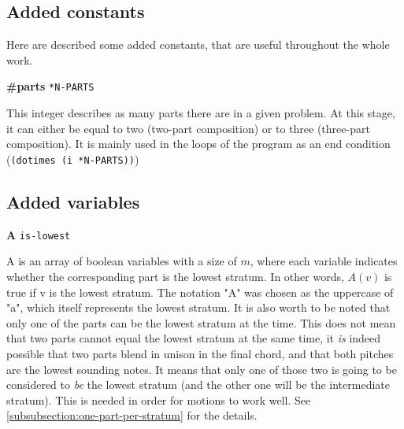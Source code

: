 \subsection{Added constants}
Here are described some added constants, that are useful throughout the whole work.

\vspace{.5cm} \noindent \textbf{\#parts} \hspace{.2cm} \texttt{*N-PARTS}

This integer describes as many parts there are in a given problem. At this stage, it can either be equal to two (two-part composition) or to three (three-part composition). It is mainly used in the loops of the program as an end condition (\texttt{(dotimes (i *N-PARTS))})




\subsection{Added variables}
\vspace{.5cm} \noindent \textbf{A} \hspace{.cm} \texttt{is-lowest} \label{is-lowest}

A is an array of boolean variables with a size of $m$, where each variable indicates whether the corresponding part is the lowest stratum. In other words, $A(v)$ is true if v is the lowest stratum. The notation "A" was chosen as the uppercase of "a", which itself represents the lowest stratum. 
It is also worth to be noted that only one of the parts can be the lowest stratum at the time. This does not mean that two parts cannot equal the lowest stratum at the same time, it \textit{is} indeed possible that two parts blend in unison in the final chord, and that both pitches are the lowest sounding notes. It means that only one of those two is going to be considered to \textit{be} the lowest stratum (and the other one will be the intermediate stratum). This is needed in order for motions to work well. See \ref{subsubsection:one-part-per-stratum} for the details.


